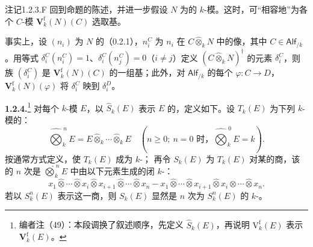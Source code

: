 \begin{SGAresult}{注记}{1.2.3.F}
回到命题的陈述，并进一步假设 $N$ 为的 $k$-模。这时，可“相容地”为各个 $C$-模 $\mathbf V_k^{\mathrm f}(N)(C)$ 选取基。

事实上，设 $(n_i)$ 为 $N$ 的（0.2.1），$n_i^C$ 为 $n_i$ 在 $C\widehat\otimes_k N$ 中的像，其中 $C\in\mathsf{Alf}_{/k}$。用等式 $\delta_i^C(n_i^C)=1$、$\delta_i^C(n_j^C)=0$（$i\ne j$）定义 $(C\widehat\otimes_k N)^\dagger$ 的元素 $\delta_i^C$，则族 $(\delta_i^C)$ 是 $\mathbf V_k^{\mathrm f}(N)(C)$ 的一组基；此外，对 $\mathsf{Alf}_{/k}$ 的每个 $\varphi:C\to D$，$\mathbf V_k^{\mathrm f}(N)(\varphi)$ 将 $\delta_i^C$ 映到 $\delta_i^D$。
\end{SGAresult}
\textbf{1.2.4.}\footnote{编者注（49）：本段调换了叙述顺序，先定义 $\widehat S_k(E)$，再说明 $\mathrm V_k^{\mathrm f}(E)$ 表示 $\mathbf V_k^{\mathrm f}(E)$。}
对每个 $k$-模 $E$，以 $\widehat S_k(E)$ 表示 $E$ 的，定义如下。设 $T_k(E)$ 为下列 $k$-模的：
\[
 \widehat{\bigotimes}_k^{\,n}E=E\widehat\otimes_k\cdots\widehat\otimes_k E
 \quad(n\geq0;\ n=0\text{ 时，}\widehat{\bigotimes}_k^{\,0}E=k).
\]
按通常方式定义，使 $T_k(E)$ 成为 $k$-；
再令 $S_k(E)$ 为 $T_k(E)$ 对某的商，该的 $n$ 次是 $\widehat{\bigotimes}_k^{\,n}E$ 中由以下元素生成的闭 $k$-：
\[
 x_1\widehat\otimes\cdots\widehat\otimes x_i\widehat\otimes x_{i+1}\widehat\otimes\cdots\widehat\otimes x_n
 -x_1\widehat\otimes\cdots\widehat\otimes x_{i+1}\widehat\otimes x_i\widehat\otimes\cdots\widehat\otimes x_n.
\]
若以 $S_k^n(E)$ 表示这一商，则 $S_k(E)$ 显然是 $n$ 次为 $S_k^n(E)$ 的 $k$-。

